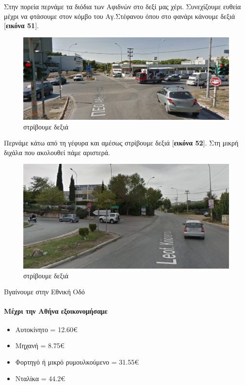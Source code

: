 Στην πορεία περνάμε τα διόδια των Αφιδνών στο δεξί μας χέρι. Συνεχίζουμε ευθεία μέχρι να φτάσουμε στον κόμβο του Αγ.Στέφανου όπου στο φανάρι κάνουμε δεξιά [\textbf{εικόνα 51}].
\begin{figure}[H]
\includegraphics[width=\textwidth]{images/lamia-athina/afidnon/afidnon_027.jpg} 
\caption{στρίβουμε δεξιά}
\end{figure}
Περνάμε κάτω από τη γέφυρα και αμέσως στρίβουμε δεξιά [\textbf{εικόνα 52}]. Στη μικρή διχάλα που ακολουθεί πάμε αριστερά.
\begin{figure}[H]
\includegraphics[width=\textwidth]{images/lamia-athina/afidnon/afidnon_028.jpg} 
\caption{στρίβουμε δεξιά}
\end{figure}
Βγαίνουμε στην Εθνική Οδό
\vspace{12pt}
\paragraph{Μέχρι την Αθήνα εξοικονομήσαμε}
\begin{itemize}
\item Αυτοκίνητο = 12.60€
\item Μηχανή = 8.75€
\item Φορτηγό ή μικρό ρυμουλκούμενο = 31.55€
\item Νταλίκα = 44.2€
\end{itemize}